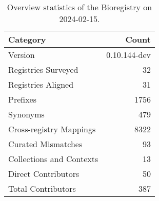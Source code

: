 \begin{table}
\caption{Overview statistics of the Bioregistry on 2024-02-15.}
\label{tab:bioregistry-summary}
\begin{tabular}{lr}
\toprule
Category & Count \\
\midrule
Version & 0.10.144-dev \\
Registries Surveyed & 32 \\
Registries Aligned & 31 \\
Prefixes & 1756 \\
Synonyms & 479 \\
Cross-registry Mappings & 8322 \\
Curated Mismatches & 93 \\
Collections and Contexts & 13 \\
Direct Contributors & 50 \\
Total Contributors & 387 \\
\bottomrule
\end{tabular}
\end{table}
